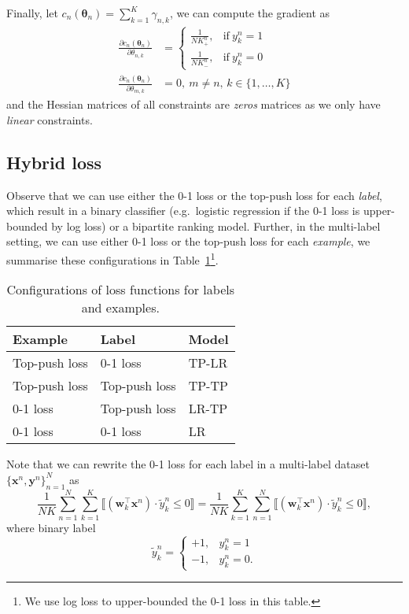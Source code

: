 \documentclass[9pt]{extarticle}
\newcommand{\llb}{\llbracket}
\newcommand{\rrb}{\rrbracket}
\newcommand{\x}{\mathbf{x}}
\newcommand{\y}{\mathbf{y}}
\newcommand{\1}{\mathbf{1}}
\newcommand{\w}{\mathbf{w}}
\newcommand{\thetabm}{\bm{\theta}}
\newcommand{\eg}{e.g.\ }
\begin{document}
Finally, let $c_n(\thetabm_n) = \sum_{k=1}^K \gamma_{n,k}$,
we can compute the gradient as
\begin{align*}
\frac{\partial c_n(\thetabm_n)} {\partial \theta_{n,k}} 
&= 
\begin{cases}
\frac{1}{N K_+^n}, & \text{if} \ y_k^n = 1 \\
\frac{1}{N K_-^n}, & \text{if} \ y_k^n = 0
\end{cases} \\
%
\frac{\partial c_n(\thetabm_n)} {\partial \theta_{m,k}} &= 0, \ m \neq n, \, k \in \{1,\dots,K\}
\end{align*}
and the Hessian matrices of all constraints are \emph{zeros} matrices as we only have \emph{linear} constraints.


\subsection{Hybrid loss}
\label{ssec:hybrid}

Observe that we can use either the 0-1 loss or the top-push loss for each \emph{label}, 
which result in a binary classifier (\eg logistic regression if the 0-1 loss is upper-bounded by log loss) or a bipartite ranking model.
Further, in the multi-label setting, we can use either 0-1 loss or the top-push loss for each \emph{example}, 
we summarise these configurations in Table~\ref{tab:config}\footnote{We use log loss to upper-bounded the 0-1 loss in this table.}.

\begin{table}[!h]
\centering
\caption{Configurations of loss functions for labels and examples.}
\label{tab:config}
\begin{tabular}{lll}
\toprule
\textbf{Example} & \textbf{Label}  & \textbf{Model} \\ \hline
Top-push loss    & 0-1 loss        & TP-LR \\
Top-push loss    & Top-push loss   & TP-TP \\
0-1 loss         & Top-push loss   & LR-TP \\
0-1 loss         & 0-1 loss        & LR    \\
\bottomrule
\end{tabular}
\end{table}

Note that we can rewrite the 0-1 loss for each label in a multi-label dataset $\{\x^n, \y^n\}_{n=1}^N$ as
\begin{equation}
\label{eq:br_equiv}
\frac{1}{NK} \sum_{n=1}^N \sum_{k=1}^K \llb (\w_k^\top \x^n) \cdot \widetilde{y}_k^n \le 0 \rrb 
= \frac{1}{NK} \sum_{k=1}^K \sum_{n=1}^N \llb (\w_k^\top \x^n) \cdot \widetilde{y}_k^n \le 0 \rrb,
\end{equation}
where binary label 
$$
\widetilde{y}_k^n = \begin{cases}
+1, & y_k^n = 1 \\
-1, & y_k^n = 0.
\end{cases}
$$
\end{document}
